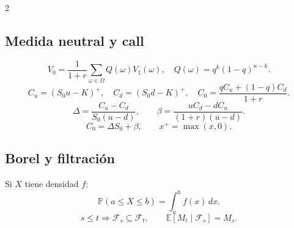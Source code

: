 \documentclass[11pt, a4paper]{article}
\begin{document}
\begin{landscape}
\begin{multicols}{2}
\subsection*{Medida neutral y call}
\[
V_0=\frac{1}{1+r}\sum_{\omega\in\Omega}Q(\omega)V_1(\omega),
\quad
Q(\omega)=q^k(1-q)^{n-k}.
\]
\[
C_u=(S_0u-K)^+,\quad C_d=(S_0d-K)^+,\quad
C_0=\frac{qC_u+(1-q)C_d}{1+r}.
\]
\[
\Delta=\frac{C_u-C_d}{S_0(u-d)},\qquad
\beta=\frac{uC_d-dC_u}{(1+r)(u-d)}.
\]
\[
C_0=\Delta S_0+\beta,\qquad x^+=\max(x,0).
\]

\subsection*{Borel y filtración}
Si \(X\) tiene densidad \(f\):
\[
\mathbb{P}(a\le X\le b)=\int_a^b f(x)\,dx.
\]
\[
s\le t\Longrightarrow\mathcal{F}_s\subseteq\mathcal{F}_t,\qquad
\mathbb{E}[M_t\mid\mathcal{F}_s]=M_s.
\]
\end{multicols}
\normalsize
\end{landscape}
\end{document}
